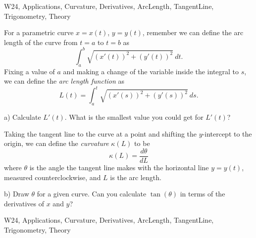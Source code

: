 \begin{tagblock}{W24, Applications, Curvature, Derivatives, ArcLength, TangentLine, Trigonometry, Theory}
\begin{question}
	


For a parametric curve $x=x(t)$, $y=y(t)$, remember we can define the arc length of the curve from $t=a$ to $t=b$ as 
\[
\int_a^b\sqrt{(x'(t))^2+(y'(t))^2} \ dt.
\]
Fixing a value of $a$ and making a change of the variable inside the integral to $s$, we can define the \textit{arc length function} as
\[
L(t)=\int_a^t\sqrt{(x'(s))^2+(y'(s))^2} \ ds.
\]



\bigskip


a) Calculate $L'(t)$. What is the smallest value you could get for $L'(t)$?

\bigskip

Taking the tangent line to the curve at a point and shifting the $y$-intercept to the origin, we can define the \textit{curvature} $\kappa(L)$ to be
\[
\kappa(L)=\frac{d\theta}{dL}
\]
where $\theta$ is the angle the tangent line makes with the horizontal line $y=y(t)$, measured counterclockwise, and $L$ is the arc length.

\bigskip

b) Draw $\theta$ for a given curve. Can you calculate $\tan(\theta)$ in terms of the derivatives of $x$ and $y$?

    
\begin{tags}
       W24, Applications, Curvature, Derivatives, ArcLength, TangentLine, Trigonometry, Theory
\end{tags}
    
\begin{diary}
\end{diary}
	
\begin{solution}

\end{solution}
	
\end{question}

\end{tagblock}

